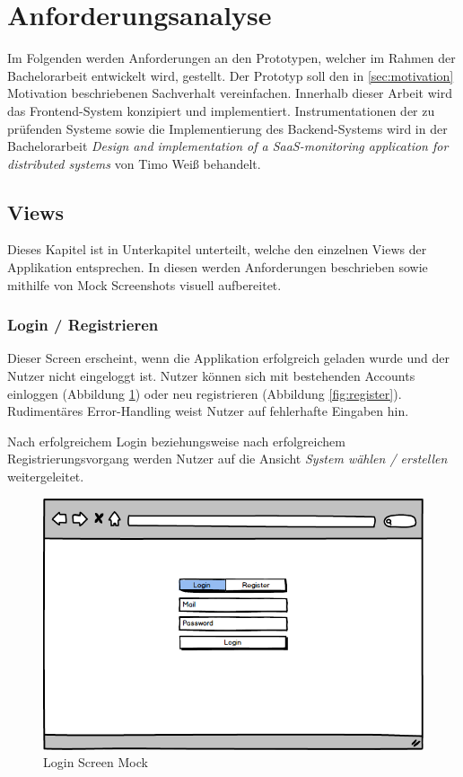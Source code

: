 \newpage

\section{Anforderungsanalyse}
\label{sec:anforderungsanalyse}
Im Folgenden werden Anforderungen an den Prototypen, welcher im Rahmen der Bachelorarbeit entwickelt wird, gestellt.
Der Prototyp soll den in \ref{sec:motivation} Motivation beschriebenen Sachverhalt vereinfachen.
Innerhalb dieser Arbeit wird das Frontend-System konzipiert und implementiert.
Instrumentationen der zu prüfenden Systeme sowie die Implementierung des Backend-Systems wird in der Bachelorarbeit \emph{
Design and implementation of a SaaS-monitoring application for distributed systems} von Timo Weiß behandelt.

\subsection{Views}

Dieses Kapitel ist in Unterkapitel unterteilt, welche den einzelnen Views der Applikation \projectname{} entsprechen.
In diesen werden Anforderungen beschrieben sowie mithilfe von Mock Screenshots visuell aufbereitet.

\subsubsection{Login / Registrieren}

Dieser Screen erscheint, wenn die Applikation erfolgreich geladen wurde und der Nutzer nicht eingeloggt ist.
Nutzer können sich mit bestehenden Accounts einloggen (Abbildung \ref{fig:login}) oder neu registrieren (Abbildung \ref{fig:register}).
Rudimentäres Error-Handling weist Nutzer auf fehlerhafte Eingaben hin.

Nach erfolgreichem Login beziehungsweise nach erfolgreichem Registrierungsvorgang werden Nutzer auf die Ansicht \emph{System wählen / erstellen} weitergeleitet.

\vspace{0.3cm}

\begin{figure}[h]
 \centering
 \includegraphics[width=0.7\linewidth]{kapitel1/mocks/Login.png}
 \caption{Login Screen Mock}
  \label{fig:login}
\end{figure}

